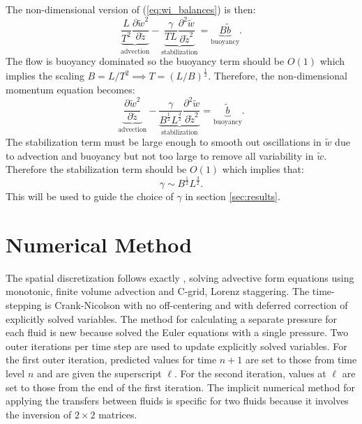 \documentclass[draft]{agujournal2019}
\begin{document}
The non-dimensional version of (\ref{eq:wi_balances}) is then:
\begin{equation}
\underbrace{{\frac{L}{T^{2}}\frac{\partial\tilde{w}^{2}}{\partial\tilde{z}}}}_{\text{advection}}-\underbrace{{\frac{\gamma}{TL}\frac{\partial^{2}\tilde{w}}{\partial\tilde{z}^{2}}}}_{\text{stabilization}}=\underbrace{B\tilde{b}}_{\text{buoyancy}}.\label{eq:wi_nonDomTmp}
\end{equation}
The flow is buoyancy dominated so the buoyancy term should be $O(1)$
which implies the scaling $B=L/T^{2}\implies T=(L/B)^{\frac{1}{2}}$. Therefore, the non-dimensional momentum equation becomes:
\begin{equation}
\underbrace{{\frac{\partial\tilde{w}^{2}}{\partial\tilde{z}}}}_{\text{advection}}-\underbrace{{\frac{\gamma}{B^{\frac{1}{2}}L^{\frac{3}{2}}}\frac{\partial^{2}\tilde{w}}{\partial\tilde{z}^{2}}}}_{\text{stabilization}}=\underbrace{\tilde{b}}_{\text{buoyancy}}.\label{eq:wi_nonDom-1}
\end{equation}
The stabilization term must be large enough to smooth out oscillations
in $\tilde{w}$ due to advection and buoyancy but not too large to
remove all variability in $\tilde{w}$. Therefore the stabilization term should be $O(1)$ which implies that:
\begin{equation}
\gamma\sim B^{\frac{1}{2}}L^{\frac{3}{2}}.\label{eq:gammaDimAnal}
\end{equation}
This will be used to guide the choice of $\gamma$ in section {\protect\ref{sec:results}}.


\section{\label{sec:numerics}Numerical Method}

The spatial discretization follows exactly , solving
advective form equations using monotonic, finite volume advection
and C-grid, Lorenz staggering. The time-stepping is Crank-Nicolson
with no off-centering and with deferred correction of explicitly solved
variables. The method for calculating a separate pressure for each fluid is new because 
solved the Euler equations with a single pressure.
Two outer iterations per time step are used to update explicitly solved variables. For the first outer
iteration, predicted values for time $n+1$ are set to those from
time level $n$ and are given the superscript $\ell$. For the second
iteration, values at $\ell$ are set to those from the end of the
first iteration. The implicit numerical method for applying the transfers
between fluids is specific for two fluids because it involves the
inversion of $2\times2$ matrices. 
\end{document}
